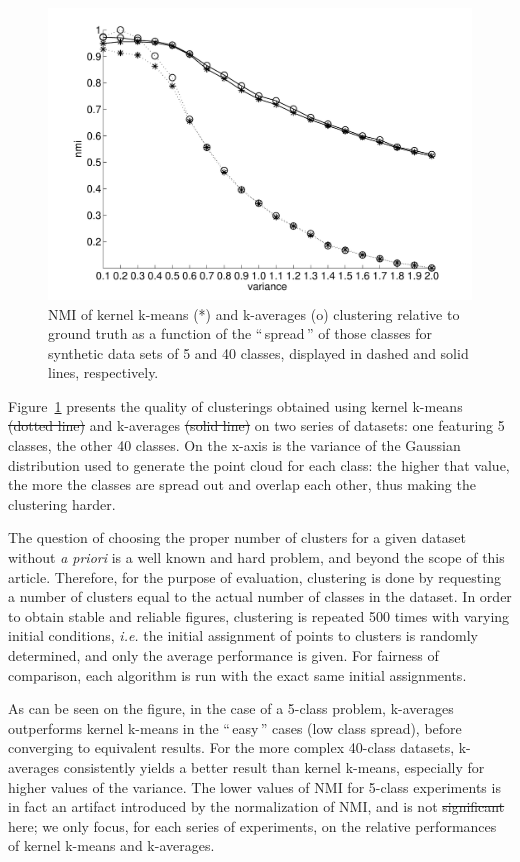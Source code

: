 \documentclass[natbib,smallextended]{svjour3}
\newcommand{\gl}[1]{``\,#1\,''} %
\providecommand{\DIFaddtex}[1]{{\protect\color{blue}\uwave{#1}}} %
\providecommand{\DIFdeltex}[1]{{\protect\color{red}\sout{#1}}}                      %
\providecommand{\DIFaddbegin}{} %
\providecommand{\DIFaddend}{} %
\providecommand{\DIFdelbegin}{} %
\providecommand{\DIFdelend}{} %
\providecommand{\DIFadd}[1]{\texorpdfstring{\DIFaddtex{#1}}{#1}} %
\providecommand{\DIFdel}[1]{\texorpdfstring{\DIFdeltex{#1}}{}} %
\newcommand{\DIFscaledelfig}{0.5}
\newlength{\DIFdelgraphicswidth} %
\newlength{\DIFdelgraphicsheight} %
\newcommand{\DIFaddincludegraphics}[2][]{{\color{blue}\fbox{\DIFOincludegraphics[#1]{#2}}}} %
\newcommand{\DIFdelincludegraphics}[2][]{%
\sbox{\DIFdelgraphicsbox}{\DIFOincludegraphics[#1]{#2}}%
\settoboxwidth{\DIFdelgraphicswidth}{\DIFdelgraphicsbox} %
\settoboxtotalheight{\DIFdelgraphicsheight}{\DIFdelgraphicsbox} %
\scalebox{\DIFscaledelfig}{%
\parbox[b]{\DIFdelgraphicswidth}{\usebox{\DIFdelgraphicsbox}\\[-\baselineskip] \rule{\DIFdelgraphicswidth}{0em}}\llap{\resizebox{\DIFdelgraphicswidth}{\DIFdelgraphicsheight}{%
\setlength{\unitlength}{\DIFdelgraphicswidth}%
\begin{picture}(1,1)%
\thicklines\linethickness{2pt} %
{\color[rgb]{1,0,0}\put(0,0){\framebox(1,1){}}}%
{\color[rgb]{1,0,0}\put(0,0){\line( 1,1){1}}}%
{\color[rgb]{1,0,0}\put(0,1){\line(1,-1){1}}}%
\end{picture}%
}\hspace*{3pt}}} %
} %
\DeclareRobustCommand{\DIFaddbegin}{\DIFOaddbegin \let\includegraphics\DIFaddincludegraphics} %
\DeclareRobustCommand{\DIFaddend}{\DIFOaddend \let\includegraphics\DIFOincludegraphics} %
\DeclareRobustCommand{\DIFdelbegin}{\DIFOdelbegin \let\includegraphics\DIFdelincludegraphics} %
\DeclareRobustCommand{\DIFdelend}{\DIFOaddend \let\includegraphics\DIFOincludegraphics} %
\begin{document}
\begin{figure}
\center
\includegraphics[width=.7\textwidth]{figures/synthetic.pdf}
\caption{NMI of kernel k-means (*) and k-averages (o) clustering relative to ground truth as a function of the \gl{spread} of those classes for synthetic data sets of 5 and 40 classes, displayed in dashed and solid lines, respectively.}
\label{fig:synth_perf}
\end{figure}

Figure~\ref{fig:synth_perf} presents the quality of clusterings obtained using kernel k-means \DIFdelbegin \DIFdel{(dotted line) }\DIFdelend and k-averages \DIFdelbegin \DIFdel{(solid line) }\DIFdelend on two series of datasets: one featuring 5 classes, the other 40 classes. On the x-axis is the variance of the Gaussian distribution used to generate the point cloud for each class: the higher that value, the more the classes are spread out and overlap each other, thus making the clustering harder.

The question of choosing the proper number of clusters for a given dataset without \textit{a priori} is a well known and hard problem, and beyond the scope of this article. Therefore, for the purpose of evaluation, clustering is done by requesting a number of clusters equal to the actual number of classes in the dataset. In order to obtain stable and reliable figures, clustering is repeated 500 times with varying initial conditions, \textit{i.e.} the initial assignment of points to clusters is randomly determined, and only the average performance is given. For fairness of comparison, each algorithm is run with the exact same initial assignments.

As can be seen on the figure, in the case of a 5-class problem, k-averages outperforms kernel k-means in the \gl{easy} cases (low class spread), before converging to equivalent results. For the more complex 40-class datasets, k-averages consistently yields a better result than kernel k-means, especially for higher values of the variance. The lower values of NMI for 5-class experiments is in fact an artifact introduced by the normalization of NMI, and is not \DIFdelbegin \DIFdel{significant }\DIFdelend \DIFaddbegin \DIFadd{important }\DIFaddend here; we only focus, for each series of experiments, on the relative performances of kernel k-means and k-averages.
\end{document}
